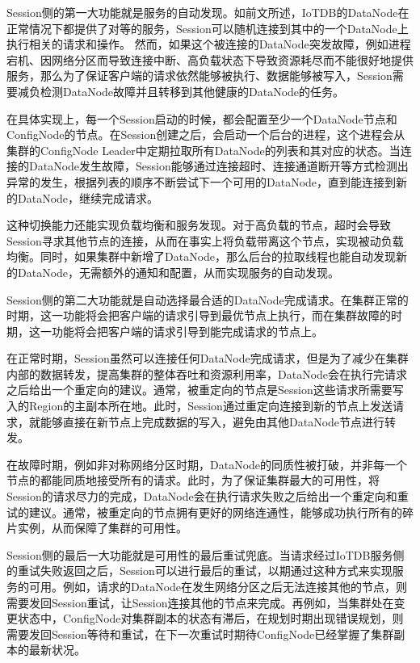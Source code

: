 Session侧的第一大功能就是服务的自动发现。如前文所述，IoTDB的DataNode在正常情况下都提供了对等的服务，Session可以随机连接到其中的一个DataNode上执行相关的请求和操作。
然而，如果这个被连接的DataNode突发故障，例如进程宕机、因网络分区而导致连接中断、高负载状态下导致资源耗尽而不能很好地提供服务，那么为了保证客户端的请求依然能够被执行、数据能够被写入，Session需要减负检测DataNode故障并且转移到其他健康的DataNode的任务。


在具体实现上，每一个Session启动的时候，都会配置至少一个DataNode节点和ConfigNode的节点。在Session创建之后，会启动一个后台的进程，这个进程会从集群的ConfigNode Leader中定期拉取所有DataNode的列表和其对应的状态。当连接的DataNode发生故障，Session能够通过连接超时、连接通道断开等方式检测出异常的发生，根据列表的顺序不断尝试下一个可用的DataNode，直到能连接到新的DataNode，继续完成请求。


这种切换能力还能实现负载均衡和服务发现。对于高负载的节点，超时会导致Session寻求其他节点的连接，从而在事实上将负载带离这个节点，实现被动负载均衡。同时，如果集群中新增了DataNode，那么后台的拉取线程也能自动发现新的DataNode，无需额外的通知和配置，从而实现服务的自动发现。


Session侧的第二大功能就是自动选择最合适的DataNode完成请求。在集群正常的时期，这一功能将会把客户端的请求引导到最优节点上执行，而在集群故障的时期，这一功能将会把客户端的请求引导到能完成请求的节点上。

在正常时期，Session虽然可以连接任何DataNode完成请求，但是为了减少在集群内部的数据转发，提高集群的整体吞吐和资源利用率，DataNode会在执行完请求之后给出一个重定向的建议。通常，被重定向的节点是Session这些请求所需要写入的Region的主副本所在地。此时，Session通过重定向连接到新的节点上发送请求，就能够直接在新节点上完成数据的写入，避免由其他DataNode节点进行转发。

在故障时期，例如非对称网络分区时期，DataNode的同质性被打破，并非每一个节点的都能同质地接受所有的请求。此时，为了保证集群最大的可用性，将Session的请求尽力的完成，DataNode会在执行请求失败之后给出一个重定向和重试的建议。通常，被重定向的节点拥有更好的网络连通性，能够成功执行所有的碎片实例，从而保障了集群的可用性。

Session侧的最后一大功能就是可用性的最后重试兜底。当请求经过IoTDB服务侧的重试失败返回之后，Session可以进行最后的重试，以期通过这种方式来实现服务的可用。例如，请求的DataNode在发生网络分区之后无法连接其他的节点，则需要发回Session重试，让Session连接其他的节点来完成。再例如，当集群处在变更状态中，ConfigNode对集群副本的状态有滞后，在规划时期出现错误规划，则需要发回Session等待和重试，在下一次重试时期待ConfigNode已经掌握了集群副本的最新状况。



